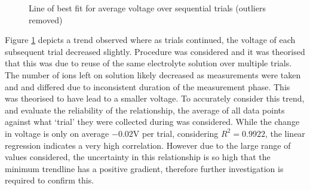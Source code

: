 \documentclass[11pt,a4paper]{article}
\begin{document}
\begin{figure}[h]

	\centering
{}
\caption{Line of best fit for average voltage over sequential trials (outliers removed)}
\label{lowingVoltage}
\end{figure}

Figure \ref{lowingVoltage} depicts a trend observed where as trials continued, the voltage of each subsequent trial decreased slightly. Procedure was considered and it was theorised that this was due to reuse of the same electrolyte solution over multiple trials. The number of ions left on solution likely decreased as measurements were taken and and differed due to inconsistent duration of the measurement phase. This was theorised to have lead to a smaller voltage. To accurately consider this trend, and evaluate the reliability of the relationship, the average of all data points against what `trial' they were collected during was considered. While the change in voltage is only on average $-0.02$V per trial, considering $R^2=0.9922$, the linear regression indicates a very high correlation. However due to the large range of values considered, the uncertainty in this relationship is so high that the minimum trendline has a positive gradient, therefore further investigation is required to confirm this. 
\end{document}
